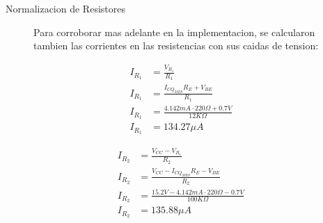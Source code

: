 \begin{frame}[allowframebreaks]{Normalizacion de Resistores}
  \begin{figure}[!ht]
    \raggedright
    Para corroborar mas adelante en la implementacion, se calcularon tambien las corrientes en las resistencias con sus
    caidas de tension:\\
    \centering
    \small
    \begin{minipage}{0.45\textwidth}
      \begin{align*}
        I_{R_1} &= \frac{V_{R_1}}{R_1}\\[6pt]
        I_{R_1} &= \frac{I_{CQ_{MES}} R_E + V_{BE}}{R_1}\\[6pt]
        I_{R_1} &= \frac{4.142mA \cdot 220\Omega + 0.7V}{12K\Omega}\\[6pt]
        I_{R_1} &= 134.27\mu A
      \end{align*}
    \end{minipage}
    \hfill
    \begin{minipage}{0.45\textwidth}
      \begin{align*}
        I_{R_2} &= \frac{V_{CC} - V_{R_1}}{R_2}\\[6pt]
        I_{R_2} &= \frac{V_{CC} - I_{CQ_{MES}} R_E - V_{BE}}{R_2}\\[6pt]
        I_{R_2} &= \frac{15.2V - 4.142mA \cdot 220\Omega - 0.7V}{100K\Omega}\\[6pt]
        I_{R_2} &= 135.88 \mu A
      \end{align*}
    \end{minipage}
  \end{figure}
  \begin{figure}[!h]
    \centering
    \begin{minipage}{0.45\textwidth}
      \centering
\end{minipage}
\end{figure}
\end{frame}
